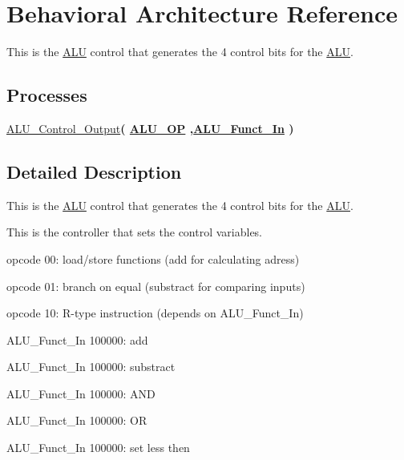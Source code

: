 \hypertarget{class_a_l_u___control_1_1_behavioral}{\section{\-Behavioral \-Architecture \-Reference}
\label{class_a_l_u___control_1_1_behavioral}
}


\-This is the \hyperlink{class_a_l_u}{\-A\-L\-U} control that generates the 4 control bits for the \hyperlink{class_a_l_u}{\-A\-L\-U}.  


\*
\*
\subsection*{\-Processes}
 \begin{DoxyCompactItemize}
\item 
\hyperlink{class_a_l_u___control_1_1_behavioral_a86f70441267014ffedcb802b679dd560}{\-A\-L\-U\-\_\-\-Control\-\_\-\-Output}{\bfseries  ( {\bfseries {\bfseries \hyperlink{class_a_l_u___control_ab5e38318e201e0011dc9fe806b2c9ea4}{\-A\-L\-U\-\_\-\-O\-P}}   ,{\bfseries \hyperlink{class_a_l_u___control_aa057cc5bea77eab736c8c526429fa204}{\-A\-L\-U\-\_\-\-Funct\-\_\-\-In}}  } )}
\end{DoxyCompactItemize}


\subsection{\-Detailed \-Description}
\-This is the \hyperlink{class_a_l_u}{\-A\-L\-U} control that generates the 4 control bits for the \hyperlink{class_a_l_u}{\-A\-L\-U}. 

\-This is the controller that sets the control variables.

opcode 00\-: load/store functions (add for calculating adress)

opcode 01\-: branch on equal (substract for comparing inputs)

opcode 10\-: \-R-\/type instruction (depends on \-A\-L\-U\-\_\-\-Funct\-\_\-\-In)

\-A\-L\-U\-\_\-\-Funct\-\_\-\-In 100000\-: add

\-A\-L\-U\-\_\-\-Funct\-\_\-\-In 100000\-: substract

\-A\-L\-U\-\_\-\-Funct\-\_\-\-In 100000\-: \-A\-N\-D

\-A\-L\-U\-\_\-\-Funct\-\_\-\-In 100000\-: \-O\-R

\-A\-L\-U\-\_\-\-Funct\-\_\-\-In 100000\-: set less then

